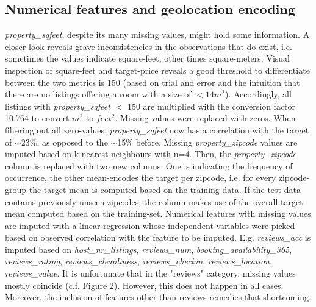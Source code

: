 \documentclass[11pt, oneside]{article}   	%
\begin{document}
\subsection{Numerical features and geolocation encoding}
\textit{property\_sqfeet}, despite its many missing values, might hold some information. A closer look reveals grave inconsistencies in the observations that do exist, i.e. sometimes the values indicate square-feet, other times square-meters. Visual inspection of square-feet and target-price reveals a good threshold to differentiate between the two metrics is 150 (based on trial and error and the intuition that there are no listings offering a room with a size of $<14m^2$). Accordingly, all listings with \textit{property\_sqfeet} $<$ 150 are multiplied with the conversion factor 10.764 to convert $m^2$ to $feet^2$.  Missing values were replaced with zeros. When filtering out all zero-values, \textit{property\_sqfeet} now has a correlation with the target of $\sim$23\%, as opposed to the $\sim$15\% before.\newline
\newline
\indent Missing \textit{property\_zipcode} values are imputed based on k-nearest-neighbours with n=4. Then, the \textit{property\_zipcode} column is replaced with two new columns. One is indicating the frequency of occurrence, the other mean-encodes the target per zipcode, i.e. for every zipcode-group the target-mean is computed based on the training-data. If the test-data contains previously unseen zipcodes, the column makes use of the overall target-mean computed based on the training-set.\newline
\newline
\indent Numerical features with missing values are imputed with a linear regression whose independent variables were picked based on observed correlation with the feature to be imputed. E.g. \textit{reviews\_acc} is imputed based on \textit{host\_nr\_listings}, \textit{reviews\_num}, \textit{booking\_availability\_365}, \textit{reviews\_rating}, \textit{reviews\_cleanliness}, \textit{reviews\_checkin}, \textit{reviews\_location}, \textit{reviews\_value}. It is unfortunate that in the "reviews" category, missing values mostly coincide (c.f. Figure 2). However, this does not happen in all cases. Moreover, the inclusion of features other than reviews remedies that shortcoming. 
\newline
\end{document}
